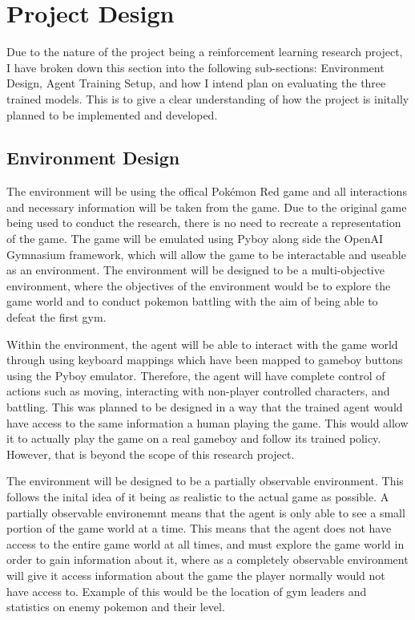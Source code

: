 \section{Project Design}

Due to the nature of the project being a reinforcement learning research project, I have broken down this section into the following sub-sections: Environment Design, Agent Training Setup, and how I intend plan on evaluating the three trained models. This is to give a clear understanding of how the project is initally planned to be implemented and developed.

\subsection{Environment Design}

The environment will be using the offical Pokémon Red game and all interactions and necessary information will be taken from the game. Due to the original game being used to conduct the research, there is no need to recreate a representation of the game. The game will be emulated using Pyboy along side the OpenAI Gymnasium framework, which will allow the game to be interactable and useable as an environment. The environment will be designed to be a multi-objective environment, where the objectives of the environment would be to explore the game world and to conduct pokemon battling with the aim of being able to defeat the first gym. 

Within the environment, the agent will be able to interact with the game world through using keyboard mappings which have been mapped to gameboy buttons using the Pyboy emulator. Therefore, the agent will have complete control of actions such as moving, interacting with non-player controlled characters, and battling. This was planned to be designed in a way that the trained agent would have access to the same information a human playing the game. This would allow it to actually play the game on a real gameboy and follow its trained policy. However, that is beyond the scope of this research project.

The environment will be designed to be a partially observable environment. This follows the inital idea of it being as realistic to the actual game as possible. A partially observable environemnt means that the agent is only able to see a small portion of the game world at a time. This means that the agent does not have access to the entire game world at all times, and must explore the game world in order to gain information about it, where as a completely observable environment will give it access information about the game the player normally would not have access to. Example of this would be the location of gym leaders and statistics on enemy pokemon and their level. 

